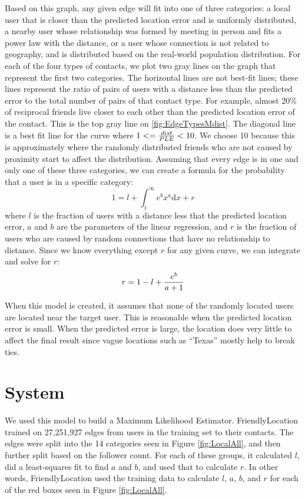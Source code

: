 Based on this graph, any given edge will fit into one of three categories: a
local user that is closer than the predicted location error and is uniformly
distributed, a nearby user whose relationship was formed by meeting in person
and fits a power law with the distance, or a user whose connection is not
related to geography, and is distributed based on the real-world population
distribution.
For each of the four types of contacts, we plot two gray lines on the graph
that represent the first two categories.
The horizontal lines are not best-fit lines; these lines represent the ratio of
pairs of users with a distance less than the predicted error to the total
number of pairs of that contact type. 
For example, almost 20\% of reciprocal friends live closer to each other than
the predicted location error of the contact. This is the top gray line on
\ref{fig:EdgeTypesMdist}.
The diagonal line is a best fit line for the curve where
\begin{math}1<={dist \over PLE}<10\end{math}.
We choose 10 because this is approximately where the randomly distributed
friends who are not caused by proximity start to affect the distribution.
Assuming that every edge is in one and only one of these three categories, we
can create a formula for the probability that a user is in a specific category:
\begin{displaymath}1=l+\int_{1}^{\infty}e^{b}x^{a}\mathrm{d}x+r\end{displaymath}
where \(l\) is the fraction of users with a distance less that the predicted
location error, \(a\) and \(b\) are the parameters of the linear regression,
and \(r\) is the fraction of users who are caused by random connections that
have no relationship to distance.
Since we know everything except \(r\) for any given curve, we can integrate and
solve for \(r\):
\begin{displaymath}r=1-l+{e^{b} \over a+1}\end{displaymath}

When this model is created, it assumes that none of the randomly located users
are located near the target user.
This is reasonable when the predicted location error is small.
When the predicted error is large, the location does very little to affect the
final result since vague locations such as ``Texas'' mostly help to break ties.

\section{System}
We used this model to build a Maximum Likelihood Estimator.
FriendlyLocation trained on 27,251,927 edges from users in the training set to
their contacts.
The edges were split into the 14 categories seen in Figure \ref{fig:LocalAll}, and
then further split based on the follower count. For each of these groups, it
calculated \(l\), did a least-squares fit to find \(a\) and \(b\), and used
that to calculate \(r\).
In other words, FriendlyLocation used the training data to calculate \(l\),
\(a\), \(b\), and \(r\) for each of the red boxes seen in Figure
\ref{fig:LocalAll}.

